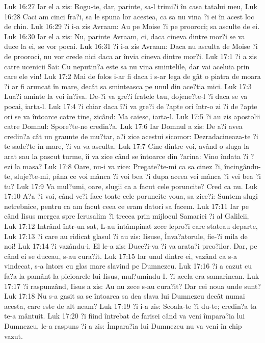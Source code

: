 Luk 16:27  Iar el a zis: Rogu-te, dar, parinte, sa-l trimi?i în casa tatalui meu,
Luk 16:28  Caci am cinci fra?i, sa le spuna lor acestea, ca sa nu vina ?i ei în acest loc de chin.
Luk 16:29  ?i i-a zis Avraam: Au pe Moise ?i pe prooroci; sa asculte de ei.
Luk 16:30  Iar el a zis: Nu, parinte Avraam, ci, daca cineva dintre mor?i se va duce la ei, se vor pocai.
Luk 16:31  ?i i-a zis Avraam: Daca nu asculta de Moise ?i de prooroci, nu vor crede nici daca ar învia cineva dintre mor?i.
Luk 17:1  ?i a zis catre ucenicii Sai: Cu neputin?a este sa nu vina smintelile, dar vai aceluia prin care ele vin!
Luk 17:2  Mai de folos i-ar fi daca i s-ar lega de gât o piatra de moara ?i ar fi aruncat în mare, decât sa sminteasca pe unul din ace?tia mici.
Luk 17:3  Lua?i aminte la voi în?iva. De-?i va gre?i fratele tau, dojene?te-l ?i daca se va pocai, iarta-l.
Luk 17:4  ?i chiar daca î?i va gre?i de ?apte ori într-o zi ?i de ?apte ori se va întoarce catre tine, zicând: Ma caiesc, iarta-l.
Luk 17:5  ?i au zis apostolii catre Domnul: Spore?te-ne credin?a.
Luk 17:6  Iar Domnul a zis: De a?i avea credin?a cât un graunte de mu?tar, a?i zice acestui sicomor: Dezradacineaza-te ?i te sade?te în mare, ?i va va asculta.
Luk 17:7  Cine dintre voi, având o sluga la arat sau la pascut turme, îi va zice când se întoarce din ?arina: Vino îndata ?i ?ezi la masa?
Luk 17:8  Oare, nu-i va zice: Pregate?te-mi ca sa cinez ?i, încingându-te, sluje?te-mi, pâna ce voi mânca ?i voi bea ?i dupa aceea vei mânca ?i vei bea ?i tu?
Luk 17:9  Va mul?umi, oare, slugii ca a facut cele poruncite? Cred ca nu.
Luk 17:10  A?a ?i voi, când ve?i face toate cele poruncite voua, sa zice?i: Suntem slugi netrebnice, pentru ca am facut ceea ce eram datori sa facem.
Luk 17:11  Iar pe când Iisus mergea spre Ierusalim ?i trecea prin mijlocul Samariei ?i al Galileii,
Luk 17:12  Intrând într-un sat, L-au întâmpinat zece lepro?i care stateau departe,
Luk 17:13  ?i care au ridicat glasul ?i au zis: Iisuse, Înva?atorule, fie-?i mila de noi!
Luk 17:14  ?i vazându-i, El le-a zis: Duce?i-va ?i va arata?i preo?ilor. Dar, pe când ei se duceau, s-au cura?it.
Luk 17:15  Iar unul dintre ei, vazând ca s-a vindecat, s-a întors cu glas mare slavind pe Dumnezeu.
Luk 17:16  ?i a cazut cu fa?a la pamânt la picioarele lui Iisus, mul?umindu-I. ?i acela era samarinean.
Luk 17:17  ?i raspunzând, Iisus a zis: Au nu zece s-au cura?it? Dar cei noua unde sunt?
Luk 17:18  Nu s-a gasit sa se întoarca sa dea slava lui Dumnezeu decât numai acesta, care este de alt neam?
Luk 17:19  ?i i-a zis: Scoala-te ?i du-te; credin?a ta te-a mântuit.
Luk 17:20  ?i fiind întrebat de farisei când va veni împara?ia lui Dumnezeu, le-a raspuns ?i a zis: Împara?ia lui Dumnezeu nu va veni în chip vazut.
